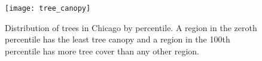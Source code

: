 \begin{figure}[H]
  \label{fig:tree_census}
    \begin{center}
      \texttt{[image: tree\_canopy]}
      \vspace*{-2cm}
      \caption{Distribution of trees in Chicago by percentile. A region in the zeroth
      percentile has the least tree canopy and a region in the 100th percentile has
      more tree cover than any other region.}
    \end{center}
\end{figure}
